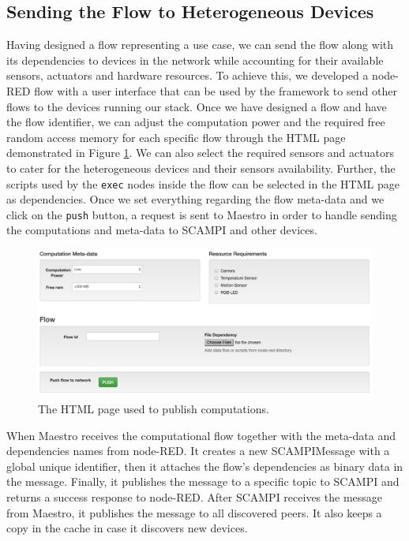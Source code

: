 \subsection{Sending the Flow to Heterogeneous Devices}


\noindent Having designed a flow representing a use case, we can send the flow along with its dependencies to devices in the network while accounting for their available sensors, actuators  and hardware resources. To achieve this, we developed a node-RED flow with  a user interface  that can be used by the framework to send other flows to the devices running our stack. Once we have designed a flow and have the flow identifier, we can adjust the computation power and the required free random access memory for each specific flow through the HTML page demonstrated in Figure \ref{fig:html-publish}. We can also select the required sensors and actuators to cater for the heterogeneous devices and their sensors availability. Further, the scripts used by the \verb|exec| nodes inside the flow can be selected in the HTML page as dependencies. Once we set everything regarding the flow meta-data and we click on the \verb|push| button, a request is sent to Maestro in order to handle sending the computations and meta-data to SCAMPI and other devices.
\begin{figure}[H]
\centering
\includegraphics[scale=0.5]{images/html-publish.png}
\caption{The HTML page used to publish computations.}
\label{fig:html-publish}
\end{figure}

\noindent When Maestro receives the computational flow  together with the meta-data and dependencies  names from node-RED. It creates a new SCAMPIMessage with  a global unique identifier, then it attaches the flow's dependencies as binary data in the message. Finally, it publishes the message to a specific topic to SCAMPI and returns a success response to node-RED. After SCAMPI receives the message from Maestro, it publishes the message to all discovered peers. It also keeps a copy in the cache in case it discovers new devices. 


